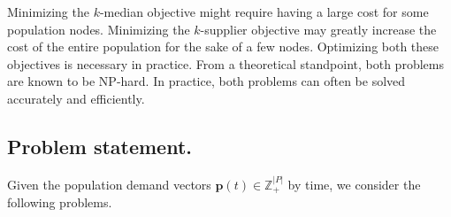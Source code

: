 Minimizing the $k$-median objective might require having a large cost for
some population nodes. Minimizing the $k$-supplier objective may greatly increase the cost of the entire population for the sake of a few nodes. Optimizing both these objectives is necessary in practice. From a theoretical standpoint, both problems are known to be NP-hard. In practice, both problems can often be solved accurately and efficiently.


\subsection*{Problem statement.} 
Given the population demand vectors $\mathbf{p}(t) \in \mathbb{Z}_+^{|P|}$ by time, 
we consider the following problems.

